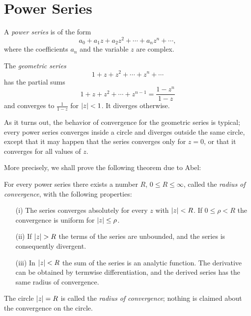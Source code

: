 \section{Power Series}
A \emph{power series} is of the form $$a_0+a_1z+a_2z^2+\cdots+a_nz^n+\cdots,$$ where the coefficients $a_n$ and the variable $z$ are complex.

\begin{example}
	The \emph{geometric series} $$1+z+z^2+\cdots+z^n+\cdots$$ has the partial sums $$1+z+z^2+\cdots+z^{n-1}=\dfrac{1-z^n}{1-z}$$ and converges to $\frac{1}{1-z}$ for $\lvert z \rvert<1$. It diverges otherwise.
\end{example}

As it turns out, the behavior of convergence for the geometric series is typical; every power series converges inside a circle and diverges outside the same circle, except that it may happen that the series converges only for $z=0$, or that it converges for all values of $z$.

More precisely, we shall prove the following theorem due to Abel:
\begin{theorem}[Abel]
	For every power series there exists a number $R$, $0 \le R \le \infty$, called the \emph{radius of convergence}, with the following properties:
	\begin{enumerate}
		\item[(i)] The series converges absolutely for every $z$ with $\lvert z \rvert<R$. If $0 \le \rho<R$ the convergence is uniform for $\lvert z \rvert \le \rho$.
		\item[(ii)] If $\lvert z \rvert>R$ the terms of the series are unbounded, and the series is consequently divergent.
		\item[(iii)] In $\lvert z \rvert<R$ the sum of the series is an analytic function. The derivative can be obtained by termwise differentiation, and the derived series has the same radius of convergence.
	\end{enumerate}
\end{theorem}
The circle $\lvert z \rvert=R$ is called the \textit{radius of convergence}; nothing is claimed about the convergence on the circle.

